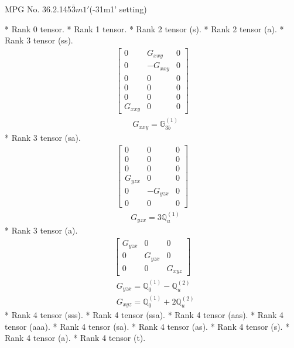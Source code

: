 \documentclass[fleqn,8pt,landscape]{jsarticle}
\begin{document}
\setcounter{MaxMatrixCols}{32}

\renewcommand{\tablename}{Table~}
\renewcommand{\figurename}{Figure~}
\begin{center}
\LARGE
MPG No. 36.2.145\quad$\bar{3}m1'$\quad(-31m1' setting)
\end{center}
* Rank 0 tensor.
* Rank 1 tensor.
* Rank 2 tensor (s).
* Rank 2 tensor (a).
* Rank 3 tensor (ss).
\begin{align*}
\begin{bmatrix} 0 & G_{xxy} & 0 \\ 0 & - G_{xxy} & 0 \\ 0 & 0 & 0 \\ 0 & 0 & 0 \\ 0 & 0 & 0 \\ G_{xxy} & 0 & 0 \end{bmatrix}
\end{align*}
\begin{align*}
& G_{xxy} = \mathbb{G}_{3b}^{(1)}
\end{align*}
* Rank 3 tensor (sa).
\begin{align*}
\begin{bmatrix} 0 & 0 & 0 \\ 0 & 0 & 0 \\ 0 & 0 & 0 \\ G_{yzx} & 0 & 0 \\ 0 & - G_{yzx} & 0 \\ 0 & 0 & 0 \end{bmatrix}
\end{align*}
\begin{align*}
& G_{yzx} = 3 \mathbb{Q}_{u}^{(1)}
\end{align*}
* Rank 3 tensor (a).
\begin{align*}
\begin{bmatrix} G_{yzx} & 0 & 0 \\ 0 & G_{yzx} & 0 \\ 0 & 0 & G_{xyz} \end{bmatrix}
\end{align*}
\begin{align*}
& G_{yzx} = \mathbb{Q}_{0}^{(1)} - \mathbb{Q}_{u}^{(2)} \\
& G_{xyz} = \mathbb{Q}_{0}^{(1)} + 2 \mathbb{Q}_{u}^{(2)}
\end{align*}
* Rank 4 tensor (sss).
* Rank 4 tensor (ssa).
* Rank 4 tensor (aas).
* Rank 4 tensor (aaa).
* Rank 4 tensor (sa).
* Rank 4 tensor (as).
* Rank 4 tensor (s).
* Rank 4 tensor (a).
* Rank 4 tensor (t).
\end{document}
